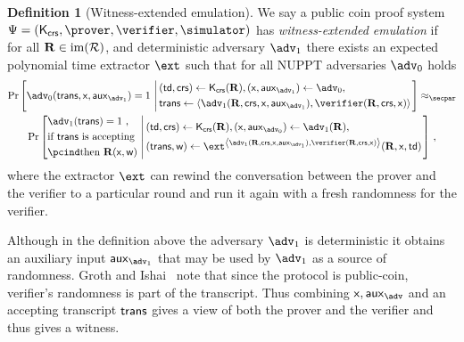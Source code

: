 \documentclass[runningheads,11pt]{llncs}
\theoremstyle{definition}
\newtheorem{definition}[theorem]{Definition}
\begin{document}
\begin{definition}[Witness-extended emulation]
	\label{def:wit_ext_em}
	We say a public coin proof system $\proofsystem = (\kcrs, \prover, \verifier, \simulator)$ has \emph{witness-extended emulation} if for all $\mathbf{R} \in \operatorname{im}(\mathcal{R})$, and deterministic adversary $\adv_1$ there exists an expected polynomial time extractor $\ext$ such that for all NUPPT adversaries $\adv_0$ holds
		\begin{multline*}
		\Pr\left[\adv_0 (\trans, \inp, \aux_{\adv_1}) = 1 \,\left|\,
		\begin{aligned}
				& (\td, \crs) \gets \kcrs(\REL), (\inp, \aux_{\adv_1}) \gets \adv_0, \\
				& \trans \gets \ip{\adv_1(\REL, \crs, \inp, \aux_{\adv_1})}{\verifier(\REL, \crs, \inp)}
			\end{aligned}
		\right.
		\right]
		 \approx_\secpar \\
		 \Pr\left[
			\begin{aligned}
				& \adv_1 (\trans) = 1\ , \\
				& \text{if $\trans$ is accepting} \\
				& \pcind \text{then $\REL(\inp, \wit)$}
			\end{aligned}\,\left|\,
			\begin{aligned}
				& (\td, \crs) \gets \kcrs(\REL), (\inp, \aux_{\adv_0}) \gets \adv_1(\REL), \\
				& (\trans, \wit )\gets \ext^{\ip{\adv_1(\REL, \crs, \inp, \aux_{\adv_1})}{\verifier(\REL, \crs, \inp)}}(\REL, \inp, \td)
			\end{aligned}
			\vphantom{\begin{aligned}
				\adv (\trans) = 1, \\
				\text{if $\trans{}$ is accepting} \\
				\pcind \text{then $\REL(\inp, \wit)$}
			\end{aligned}}\right.
			\right]\,,
\end{multline*}
where the extractor $\ext$ can rewind the conversation between the prover and the verifier to a particular round and run it again with a fresh randomness for the verifier.
\end{definition}
Although in the definition above the adversary $\adv_1$ is deterministic it obtains an auxiliary input $\aux_{\adv_1}$ that may be used by $\adv_1$ as a source of randomness. Groth and Ishai~\cite{EC:GroIsh08} note that since the protocol is public-coin, verifier's randomness is part of the transcript. Thus combining $\inp, \aux_\adv$ and an accepting transcript $\mathsf{trans}$ gives a view of both the prover and the verifier and thus gives a witness.
\end{document}

